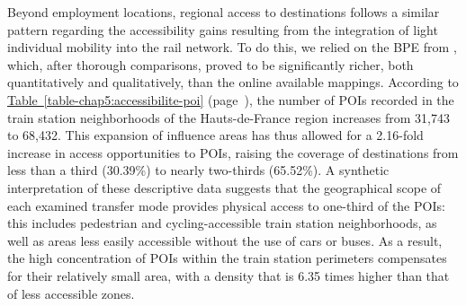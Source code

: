 \begin{refsegment}
Beyond employment locations, regional access to destinations follows a similar pattern regarding the accessibility gains resulting from the integration of light individual mobility into the rail network. To do this, we relied on the \acrfull{BPE} from \textcolor{blue}{\textcite{insee_base_2021}}, which, after thorough comparisons, proved to be significantly richer, both quantitatively and qualitatively, than the online available mappings. According to \hyperref[table-chap5:accessibilite-poi]{Table~\ref{table-chap5:accessibilite-poi}} (page~\pageref{table-chap5:accessibilite-poi}), the number of \acrshort{POIs} recorded in the train station neighborhoods of the Hauts-de-France region increases from 31,743 to 68,432. This expansion of influence areas has thus allowed for a 2.16-fold increase in access opportunities to \acrshort{POIs}, raising the coverage of destinations from less than a third (30.39\%) to nearly two-thirds (65.52\%). A synthetic interpretation of these descriptive data suggests that the geographical scope of each examined transfer mode provides physical access to one-third of the \acrshort{POIs}: this includes pedestrian and cycling-accessible train station neighborhoods, as well as areas less easily accessible without the use of cars or buses. As a result, the high concentration of \acrshort{POIs} within the train station perimeters compensates for their relatively small area, with a density that is 6.35 times higher than that of less accessible zones.%



\end{refsegment}
